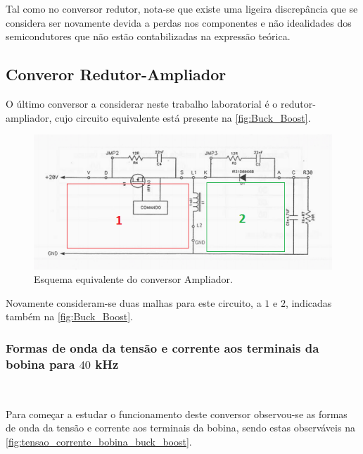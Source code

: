 \documentclass[a4paper,11pt]{article}
\numberwithin{equation}{section}
\begin{document}
Tal como no conversor redutor, nota-se que existe uma ligeira discrepância que se considera ser novamente devida a perdas nos componentes e não idealidades dos semicondutores que não estão contabilizadas na expressão teórica.

\subsection{Converor Redutor-Ampliador}

O último conversor a considerar neste trabalho laboratorial é o redutor-ampliador, cujo circuito equivalente está presente na \autoref{fig:Buck_Boost}.

\begin{figure}[H]
	\centering
	\includegraphics[keepaspectratio=true, scale=1]{teoricas/Buck_Boost}
	\caption{Esquema equivalente do conversor Ampliador.}
	\label{fig:Buck_Boost}
	\vspace{-0.8em}
\end{figure}

Novamente consideram-se duas malhas para este circuito, a $1$ e $2$, indicadas também na \autoref{fig:Buck_Boost}.

\subsubsection{Formas de onda da tensão e corrente aos terminais da bobina para $40$ kHz}\mbox{}\

Para começar a estudar o funcionamento deste conversor observou-se as formas de onda da tensão e corrente aos terminais da bobina, sendo estas observáveis na \autoref{fig:tensao_corrente_bobina_buck_boost}.
\end{document}
